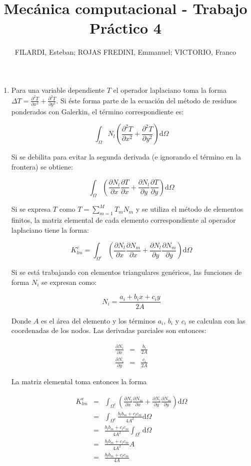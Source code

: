 \documentclass{article}
\title{\textbf{Mecánica computacional - Trabajo Práctico 4}}
\author{FILARDI, Esteban; ROJAS FREDINI, Emmanuel; VICTORIO, Franco}
\date{}
\def\domega{\mbox{d}\Omega}
\def\intomega#1{\int_\Omega #1 \domega}
\def\intomegae#1{\int_{\Omega^e} #1 \domega}
\def\summ{\sum_{m=1}^M}
\def\partialx#1{\frac{\partial #1}{\partial x}}
\def\partialy#1{\frac{\partial #1}{\partial y}}
\def\partialxx#1{\frac{\partial^2 #1}{\partial x^2}}
\def\partialyy#1{\frac{\partial^2 #1}{\partial y^2}}
\begin{document}
\maketitle

\begin{enumerate}[1)]
    \item{ %
        Para una variable dependiente $T$ el operador laplaciano toma la forma
        $\Delta T = \partialxx{T} + \partialyy{T}$. Si éste forma parte de la ecuación
        del método de residuos ponderados con Galerkin, el término correspondiente es:

        \[ \intomega{N_l \left( \partialxx{T} + \partialyy{T} \right)} \]

        Si se debilita para evitar la segunda derivada (e ignorando el término
        en la frontera) se obtiene:

        \[ \intomega{\left(\partialx{N_l}\partialx{T} + \partialy{N_l}\partialy{T}\right)} \]

        Si se expresa $T$ como $T = \summ T_m N_m$ y se utiliza el método de
        elementos finitos, la matriz elemental de cada elemento correspondiente al operador
        laplaciano tiene la forma:

        \[ K_{lm}^e = \intomegae{\left( \partialx{N_l}\partialx{N_m} + \partialy{N_l}\partialy{N_m}\right)} \]

        Si se está trabajando con elementos triangulares genéricos, las funciones de forma $N_i$
        se expresan como:

        \[ N_i = \frac{a_i + b_i x + c_i y}{2A} \]

        Donde $A$ es el área del elemento y los términos $a_i$, $b_i$ y $c_i$ se calculan
        con las coordenadas de los nodos. Las derivadas parciales son entonces:

        \begin{eqnarray*}
            \partialx{N_i} &=& \frac{b_i}{2A} \\
            \partialy{N_i} &=& \frac{c_i}{2A}
        \end{eqnarray*}

        La matriz elemental toma entonces la forma

        \begin{eqnarray*}
            K_{lm}^e &=& \intomegae{\left( \partialx{N_l}\partialx{N_m} + \partialy{N_l}\partialy{N_m}\right)} \\
            &=& \intomegae{\frac{b_l b_m + c_l c_m}{4 A^2}} \\
            &=& \frac{b_l b_m + c_l c_m}{4 A^2} \intomegae{} \\
            &=& \frac{b_l b_m + c_l c_m}{4 A^2} A \\
            &=& \frac{b_l b_m + c_l c_m}{4 A} \\
        \end{eqnarray*}

}
\end{enumerate}
\end{document}
